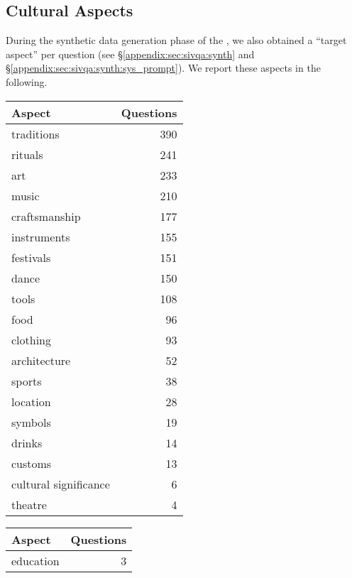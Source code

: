 \subsection{Cultural Aspects}
\label{appedix:sec:sivqa:aspects}
%
During the synthetic data generation phase of the \sivqa, we also obtained a ``target aspect'' per question (see \S\ref{appendix:sec:sivqa:synth} and \S\ref{appendix:sec:sivqa:synth:sys_prompt}).
%
We report these aspects in the following.
%
\begin{table*}[ht!]
    \centering
    \small
    \begin{minipage}[t]{0.29\textwidth}
        \centering
        \begin{tabular}{lr}
            \toprule
            Aspect & Questions \\
            \midrule
            traditions & 390 \\
            rituals & 241 \\
            art & 233 \\
            music & 210 \\
            craftsmanship & 177 \\
            instruments & 155 \\
            festivals & 151 \\
            dance & 150 \\
            tools & 108 \\
            food & 96 \\
            clothing & 93 \\
            architecture & 52 \\
            sports & 38 \\
            location & 28 \\
            symbols & 19 \\
            drinks & 14 \\
            customs & 13 \\
            cultural significance & 6 \\
            theatre & 4 \\
            \bottomrule
        \end{tabular}
    \end{minipage}%
    \begin{minipage}[t]{0.29\textwidth}
        \centering
        \begin{tabular}{lr}
            \toprule
            Aspect & Questions \\
            \midrule
            education & 3 \\

\end{tabular}
\end{minipage}
\end{table*}
